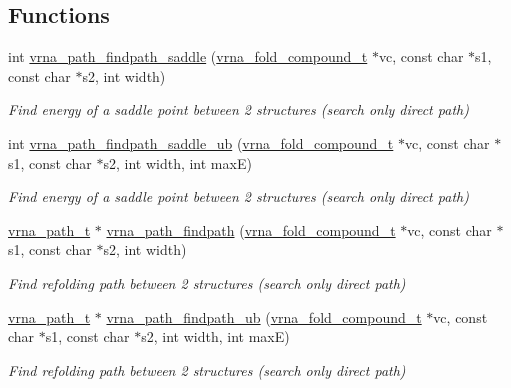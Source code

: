 \subsection*{Functions}
\begin{DoxyCompactItemize}
\item 
int \hyperlink{group__direct__paths_gad611574a76593e26021f177e7854b6b4}{vrna\+\_\+path\+\_\+findpath\+\_\+saddle} (\hyperlink{group__fold__compound_ga1b0cef17fd40466cef5968eaeeff6166}{vrna\+\_\+fold\+\_\+compound\+\_\+t} $\ast$vc, const char $\ast$s1, const char $\ast$s2, int width)
\begin{DoxyCompactList}\small\item\em Find energy of a saddle point between 2 structures (search only direct path) \end{DoxyCompactList}\item 
int \hyperlink{group__direct__paths_gada8d722e37401b1aea30128b07555771}{vrna\+\_\+path\+\_\+findpath\+\_\+saddle\+\_\+ub} (\hyperlink{group__fold__compound_ga1b0cef17fd40466cef5968eaeeff6166}{vrna\+\_\+fold\+\_\+compound\+\_\+t} $\ast$vc, const char $\ast$s1, const char $\ast$s2, int width, int maxE)
\begin{DoxyCompactList}\small\item\em Find energy of a saddle point between 2 structures (search only direct path) \end{DoxyCompactList}\item 
\hyperlink{group__direct__paths_ga818d4f3d1cf8723d6905990b08d909fe}{vrna\+\_\+path\+\_\+t} $\ast$ \hyperlink{group__direct__paths_ga4b2283c4142cafd99678495585fcc842}{vrna\+\_\+path\+\_\+findpath} (\hyperlink{group__fold__compound_ga1b0cef17fd40466cef5968eaeeff6166}{vrna\+\_\+fold\+\_\+compound\+\_\+t} $\ast$vc, const char $\ast$s1, const char $\ast$s2, int width)
\begin{DoxyCompactList}\small\item\em Find refolding path between 2 structures (search only direct path) \end{DoxyCompactList}\item 
\hyperlink{group__direct__paths_ga818d4f3d1cf8723d6905990b08d909fe}{vrna\+\_\+path\+\_\+t} $\ast$ \hyperlink{group__direct__paths_ga8d47812616303f40057dfb033869863a}{vrna\+\_\+path\+\_\+findpath\+\_\+ub} (\hyperlink{group__fold__compound_ga1b0cef17fd40466cef5968eaeeff6166}{vrna\+\_\+fold\+\_\+compound\+\_\+t} $\ast$vc, const char $\ast$s1, const char $\ast$s2, int width, int maxE)
\begin{DoxyCompactList}\small\item\em Find refolding path between 2 structures (search only direct path) \end{DoxyCompactList}\item 

\end{DoxyCompactItemize}
